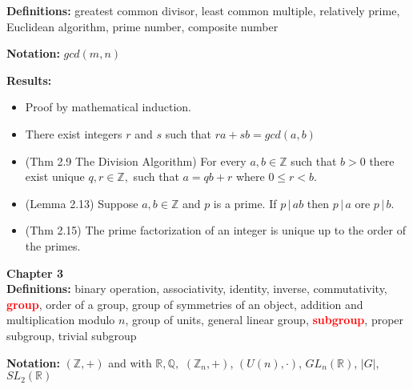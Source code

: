 \documentclass[12pt]{article}
\newcommand{\bbZ}{\mathbb{Z}}
\newcommand{\bbR}{\mathbb{R}}
\newcommand{\bbQ}{\mathbb{Q}}
\newcommand{\divs}{\, \big | \,}
\newcommand{\bfr}[1]{\textbf{\textcolor{red}{#1}}}
\begin{document}
\textbf{Definitions:} greatest common divisor, least common multiple, relatively prime, Euclidean algorithm, prime number, composite number

\textbf{Notation:} $gcd(m,n)$

\textbf{Results:}
\begin{itemize}
	\item Proof by mathematical induction.
	\item There exist integers $r$ and $s$ such that $ra+sb=gcd(a,b)$
	\item (Thm 2.9 The Division Algorithm) For every $a,b \in \bbZ$ such that $b >0$ there exist unique $q,r \in \bbZ,$ such that $a=qb+r$ where $0 \leq r <b.$
	\item (Lemma 2.13) Suppose $a,b \in \bbZ$ and $p$ is a prime. If $p \divs ab$ then $p \divs a$ ore $p \divs b.$
	\item (Thm 2.15) The prime factorization of an integer is unique up to the order of the primes.
\end{itemize}

\noindent \textbf{Chapter 3}\\

\textbf{Definitions:} binary operation, associativity, identity, inverse, commutativity, \bfr{group}, order of a group, group of symmetries of an object, addition and multiplication modulo $n$, group of units, general linear group, \bfr{subgroup}, proper subgroup, trivial subgroup

\textbf{Notation:} $(\bbZ,+)$ and with $\bbR,\bbQ,$  $(\bbZ_n,+)$, $(U(n), \cdot )$, $GL_n(\bbR)$, $|G|$, $SL_2(\bbR)$
\end{document}
